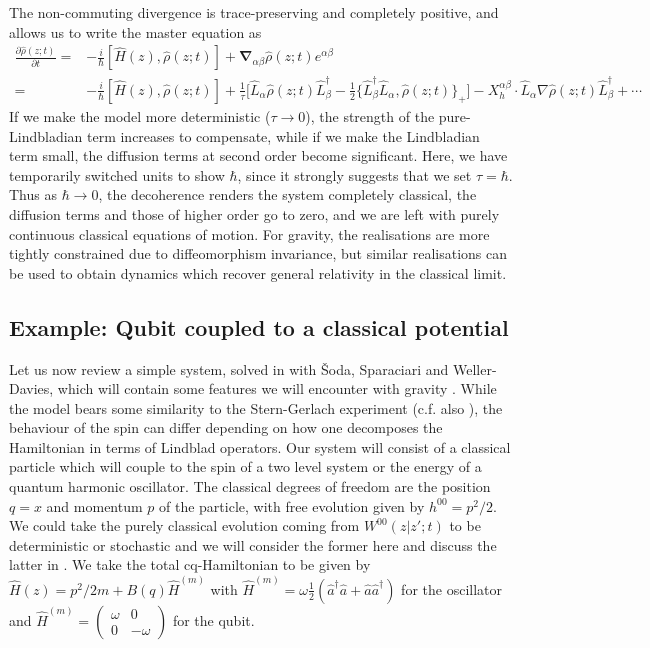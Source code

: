 \documentclass[aps,pra,showpacs,citeautoscript,amsmath,amssymb,floatfix,superscriptaddress,bbm, verbatim,amsfonts,changes,11pt,nofootinbib,longbibliography]{revtex4-2}
\def\z{{z}}
\def\L{{\hat{L}}}
\def\Hq{\hat{H}}
\def\Hqm{\hat{H}^{(m)}}
\def\baseab{e^{\alpha\beta}}
\def\PQdiv{\boldsymbol{\nabla}_{\alpha\beta}}
\def\rate{{W}}
\def\ab{^{\alpha\beta}}
\renewcommand{\varrho}{\hat{\rho}}
\def\psiz{{\varrho(\z;t)}}
\def\bfa{\hat{a}}
\begin{document}
The non-commuting divergence is trace-preserving and completely positive, and allows us to write the master equation as
\begin{align}
\frac{\partial\psiz}{\partial t}=
  &-\frac{i}{\hbar}[\Hq(\z),\psiz]
+\PQdiv\psiz\baseab
  \nonumber\\
  =& -\frac{i}{\hbar}[\Hq(\z),\psiz]
  +\frac{1}{\tau}
  \Big[
\L_\alpha\psiz\L^\dagger_\beta
-
\frac{1}{2}\{ \L^\dagger_\beta\L_\alpha,\psiz  \}_+
\Big]
 -X_h\ab\cdot\L_\alpha \nabla\psiz\L_\beta^\dagger
  +\cdots
\label{eq:simplemaster}
\end{align}
If we make the model more deterministic ($\tau\rightarrow 0$), the strength of the pure-Lindbladian term increases to compensate, while if we make the Lindbladian term small, the diffusion terms at second order become significant. Here, we have temporarily switched units to show $\hbar$, since it strongly suggests that we set $\tau=\hbar$. Thus as $\hbar\rightarrow 0$, the decoherence renders the system completely classical, the diffusion terms and those of higher order go to zero, and we are left with purely continuous classical equations of motion. For gravity, the realisations are more 
tightly constrained due to diffeomorphism invariance, but similar realisations can be used to obtain dynamics which recover general relativity in the classical limit. 


\subsection{Example: Qubit coupled to a classical potential}
\label{sec:qubit}

Let us now review a simple system, solved in  \cite{UCLqubit} with Šoda, Sparaciari and Weller-Davies, which will contain some features we will encounter with gravity \cite{carlo_foot}.  While the model bears some similarity to the Stern-Gerlach experiment (c.f. also  \cite{diosi2000quantum}), the behaviour of the spin can differ depending on how one decomposes the Hamiltonian in terms of Lindblad operators. 
Our system will consist of a classical particle which will couple to the spin of a two level system or the energy of a quantum harmonic oscillator. The classical degrees of freedom are the position $q=x$ and momentum $p$ of the particle, with free evolution given by $h^{00}=p^2/2$. We could take the purely classical evolution \label{par:pureclassical}coming from $\rate^{00}(\z|\z';t)$ to be deterministic or stochastic and we will consider the former here and discuss the latter in  \cite{UCLqubit}.  We take the total cq-Hamiltonian to
be given by $\Hq(\z)=p^2/2m+B(q)\Hqm$ with $\Hqm=\omega \frac{1}{2}({\bfa}^\dagger{\bfa}+{\bfa}{\bfa}^\dagger)$ for the oscillator and 
$\Hqm=
\begin{pmatrix} \omega & 0\\ 0 & -\omega\end{pmatrix}$ for the qubit.
\end{document}
